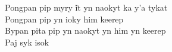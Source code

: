 \begin{linenumbers}\begingroup\raggedright
 
\noindent   Pongpan pip myry ĩt yn naokyt ka y’a tykat\\
  Pongpan pip yn ioky him keerep\\
  Bypan pita pip yn naokyt yn him yn keerep\\
  Paj syk isok
 
\end{linenumbers}\endgroup

\bigskip

